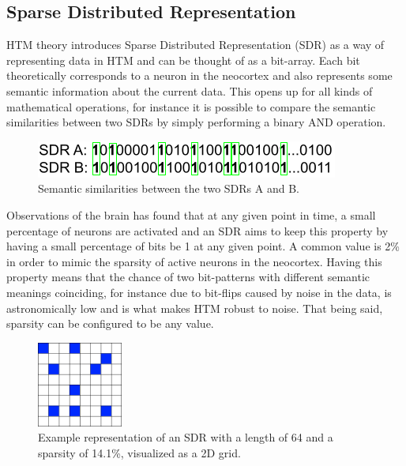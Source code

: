 \subsection{Sparse Distributed Representation}
HTM theory introduces Sparse Distributed Representation (SDR) as a way of representing data in HTM and can be thought of as a bit-array. Each bit theoretically corresponds to a neuron in the neocortex and also represents some semantic information about the current data. This opens up for all kinds of mathematical operations, for instance it is possible to compare the semantic similarities between two SDRs by simply performing a binary AND operation.
\begin{figure}[H]
    \centering
    \includegraphics{resources/related_works/sdr-semantics.png}
    \caption[SDR Semantic Comparison]{Semantic similarities between the two SDRs A and B.}
    \label{fig:sdr_semantics}
\end{figure}
Observations of the brain has found that at any given point in time, a small percentage of neurons are activated and an SDR aims to keep this property by having a small percentage of bits be 1 at any given point. A common value is 2\% in order to mimic the sparsity of active neurons in the neocortex. Having this property means that the chance of two bit-patterns with different semantic meanings coinciding, for instance due to bit-flips caused by noise in the data, is astronomically low and is what makes HTM robust to noise. That being said, sparsity can be configured to be any value.
\begin{figure}[H]
    \centering
    \includegraphics[width=0.25\textwidth]{resources/related_works/SDR.png}
    \caption[Example SDR]{Example representation of an SDR with a length of 64 and a sparsity of 14.1\%, visualized as a 2D grid.}
\end{figure}
